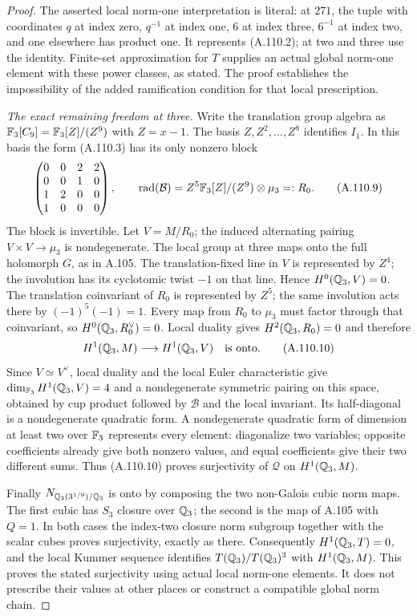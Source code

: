 \begin{proof}
The asserted local norm-one interpretation is literal:
at $271$, the tuple with coordinates $q$ at index zero,
$q^{-1}$ at index one, $6$ at index three, $6^{-1}$ at
index two, and one elsewhere has product one.
It represents (A.110.2); at two and three use the identity.
Finite-set approximation for $T$ supplies an actual global
norm-one element with these power classes, as stated.
The proof establishes the impossibility of the added
ramification condition for that local prescription.

\emph{The exact remaining freedom at three.}
Write the translation group algebra as
$\mathbb F_3[C_9]=\mathbb F_3[Z]/(Z^9)$ with $Z=x-1$.
The basis $Z,Z^2,\ldots,Z^8$ identifies $I_1$.
In this basis the form (A.110.3) has its only nonzero block
\[
 \begin{pmatrix}
 0&0&2&2\\0&0&1&0\\1&2&0&0\\1&0&0&0
 \end{pmatrix},
 \qquad
 \operatorname{rad}(\mathcal B)=
                    Z^5\mathbb F_3[Z]/(Z^9)\otimes\mu_3=:R_0.
 \tag{A.110.9}
\]
The block is invertible.  Let $V=M/R_0$; the induced alternating
pairing $V\times V\to\mu_3$ is nondegenerate.
The local group at three maps onto the full holomorph $G$,
as in A.105.
The translation-fixed line in $V$ is represented by $Z^4$;
the involution has its cyclotomic twist $-1$ on that line.
Hence $H^0(\mathbb Q_3,V)=0$.
The translation coinvariant of $R_0$ is represented by $Z^5$;
the same involution acts there by $(-1)^5(-1)=1$.
Every map from $R_0$ to $\mu_3$ must factor through that
coinvariant, so $H^0(\mathbb Q_3,R_0^\vee)=0$.
Local duality \cite[I, Corollary 2.3]{BIR_MilneADT}
gives $H^2(\mathbb Q_3,R_0)=0$ and therefore
\[
       H^1(\mathbb Q_3,M)\longrightarrow H^1(\mathbb Q_3,V)
                    \quad\text{is onto}.
 \tag{A.110.10}
\]
Since $V\simeq V^\vee$, local duality and the local Euler
characteristic \cite[I, Theorem 2.8]{BIR_MilneADT}
give $\dim_{\mathbb F_3}H^1(\mathbb Q_3,V)=4$ and a
nondegenerate symmetric pairing on this space, obtained by
cup product followed by $\mathcal B$ and the local invariant.
Its half-diagonal is a nondegenerate quadratic form.
A nondegenerate quadratic form of dimension at least two over
$\mathbb F_3$ represents every element: diagonalize two variables;
opposite coefficients already give both nonzero values, and
equal coefficients give their two different sums.
Thus (A.110.10) proves surjectivity of $\mathcal Q$ on
$H^1(\mathbb Q_3,M)$.

Finally $N_{\mathbb Q_3(3^{1/9})/\mathbb Q_3}$ is onto by composing the two
non-Galois cubic norm maps.  The first cubic has $S_3$ closure
over $\mathbb Q_3$; the second is the map of A.105 with $Q=1$.
In both cases the index-two closure norm subgroup together
with the scalar cubes proves surjectivity, exactly as there.
Consequently $H^1(\mathbb Q_3,T)=0$, and the local Kummer sequence
identifies $T(\mathbb Q_3)/T(\mathbb Q_3)^3$ with $H^1(\mathbb Q_3,M)$.
This proves the stated surjectivity using actual local
norm-one elements.  It does not prescribe their values at
other places or construct a compatible global norm chain.
\end{proof}

